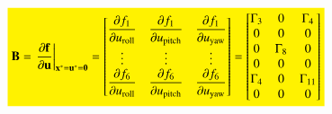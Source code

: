 \documentclass[3p]{elsarticle}
\begin{document}
\begin{equation}
    \colorbox{yellow}{$
    \mathbf{B} = \left.\dfrac{\partial \mathbf{f}}{\partial \mathbf{u}}\right|_{\boldsymbol{{\mathrm{x}}}^*= \boldsymbol{{\mathrm{u}}}^*=\boldsymbol{0}} = \begin{bmatrix}
        \dfrac{\partial f_1}{\partial u_\text{roll}} & \dfrac{\partial f_1}{\partial u_\text{pitch}} & \dfrac{\partial f_1}{\partial u_\text{yaw}}\\
        \vdots & \vdots & \vdots \\
        \dfrac{\partial f_6}{\partial u_\text{roll}} & \dfrac{\partial f_6}{\partial u_\text{pitch}} & \dfrac{\partial f_6}{\partial u_\text{yaw}}
    \end{bmatrix} =     \begin{bmatrix}
        \Gamma_3 & 0 & \Gamma_4\\
        0 & 0 & 0 \\
        0 & \Gamma_8 & 0 \\
        0 & 0 & 0 \\
        \Gamma_4 & 0 & \Gamma_{11} \\
        0 & 0 & 0
    \end{bmatrix}$}
\end{equation}
\end{document}
